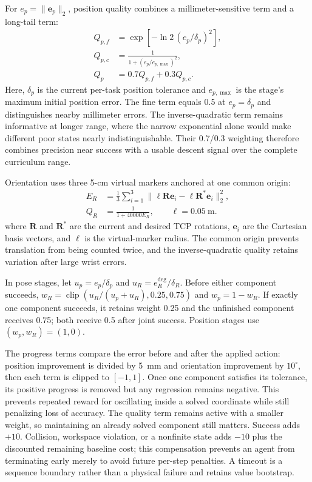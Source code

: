 \documentclass[conference]{IEEEtran}
\begin{document}
For $e_p=\|\mathbf e_p\|_2$, position quality combines a millimeter-sensitive term and a long-tail term:
\begin{equation}
\begin{aligned}
Q_{p,f}&=\exp\!\left[-\ln 2\,(e_p/\delta_p)^2\right],\\
Q_{p,c}&=\frac{1}{1+(e_p/e_{p,\max})^2},\\
Q_p&=0.7Q_{p,f}+0.3Q_{p,c}.
\end{aligned}
\label{eq:position_quality}
\end{equation}
Here, $\delta_p$ is the current per-task position tolerance and $e_{p,\max}$ is the stage's maximum initial position error. The fine term equals 0.5 at $e_p=\delta_p$ and distinguishes nearby millimeter errors. The inverse-quadratic term remains informative at longer range, where the narrow exponential alone would make different poor states nearly indistinguishable. Their 0.7/0.3 weighting therefore combines precision near success with a usable descent signal over the complete curriculum range.

Orientation uses three 5-cm virtual markers anchored at one common origin:
\begin{equation}
\begin{aligned}
E_R&=\frac{1}{3}\sum_{i=1}^{3}
\|\ell\mathbf R\mathbf e_i-\ell\mathbf R^*\mathbf e_i\|_2^2,\\
Q_R&=\frac{1}{1+40000E_R},\qquad \ell=0.05\ \mathrm m.
\end{aligned}
\label{eq:orientation_quality}
\end{equation}
where $\mathbf R$ and $\mathbf R^*$ are the current and desired TCP rotations, $\mathbf e_i$ are the Cartesian basis vectors, and $\ell$ is the virtual-marker radius. The common origin prevents translation from being counted twice, and the inverse-quadratic quality retains variation after large wrist errors.

In pose stages, let $u_p=e_p/\delta_p$ and
$u_R=e_R^{\mathrm{deg}}/\delta_R$. Before either component succeeds,
$w_R=\operatorname{clip}(u_R/(u_p+u_R),0.25,0.75)$ and $w_p=1-w_R$.
If exactly one component succeeds, it retains weight 0.25 and the unfinished component receives 0.75; both receive 0.5 after joint success. Position stages use $(w_p,w_R)=(1,0)$.

The progress terms compare the error before and after the applied action: position improvement is divided by 5~mm and orientation improvement by $10^{\circ}$, then each term is clipped to $[-1,1]$. Once one component satisfies its tolerance, its positive progress is removed but any regression remains negative. This prevents repeated reward for oscillating inside a solved coordinate while still penalizing loss of accuracy. The quality term remains active with a smaller weight, so maintaining an already solved component still matters. Success adds $+10$. Collision, workspace violation, or a nonfinite state adds $-10$ plus the discounted remaining baseline cost; this compensation prevents an agent from terminating early merely to avoid future per-step penalties. A timeout is a sequence boundary rather than a physical failure and retains value bootstrap.
\end{document}
